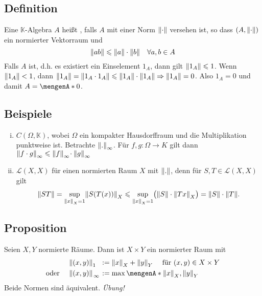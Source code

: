 \subsection[Definition: Normierte $\mathds{K}$-Algebra]{Definition} %
\label{sub:210}
Eine $\mathds{K}$-Algebra $A$ heißt , falls $A$ mit einer Norm $\norm{\cdot}$ versehen ist, so dass $(A,\norm{\cdot} )$ ein normierter Vektorraum und
\[
	\norm{a b} \le \norm{a} \cdot \norm{b} \quad \forall a,b \in A   
\]
Falls $A$  ist, d.h. es existiert ein Einselement $1_A$, dann gilt $\norm{1_A} \le 1$.
Wenn $\norm{1_A} < 1$, dann $\norm{1_A} = \norm{1_A \cdot 1_A} \le \norm{1_A} \cdot \norm{1_A} \Rightarrow \norm{1_A} =0 $. Also $1_A=0$ und damit $A= \set{0}$.

\subsection[Beispiele für normierte Algebren]{Beispiele} %
\label{sub:211}
\begin{enumerate}[(i)]
	\item $C(\Omega,\mathds{K})$, wobei $\Omega$ ein kompakter Hausdorffraum und die Multiplikation punktweise ist. Betrachte $\norm[\infty]{.}$. Für $f,g \colon \Omega \to K$ gilt dann
	$\norm[\infty]{f \cdot g} \le \norm[\infty]{f} \!\cdot \norm[\infty]{g}$
	\item $\mathcal{L}(X,X)$ für einen normierten Raum $X$ mit $\norm{.}$, denn für $S,T \in \mathcal{L}(X,X)$ gilt
	\[
		\norm{S T} = \sup_{\norm[X]{x}=1} \norm[X]{S(T(x))} \le \sup_{\norm[X]{x}=1} \enbrace[\big]{\norm{S} \cdot \norm[X]{Tx}} = \norm{S} \cdot \norm{T}.     
	\]
\end{enumerate}

\subsection[Proposition: Norm auf dem Produkt normierter Räume]{Proposition} %
\label{sub:212}
Seien $X,Y$ normierte Räume. Dann ist $X \times Y$ ein normierter Raum mit 
\begin{align*}
	 \norm[\minwidthbox{1\hfill}{1em}]{(x,y)} &:= \norm[X]{x} + \norm[Y]{y}   \quad \text{ für } (x,y) \in X \times Y \\
	\text{oder } \quad \norm[\minwidthbox{\infty}{1em}]{(x,y)} &:= \max \set{\norm[X]{x}, \norm[Y]{y}}  
\end{align*}
Beide Normen sind äquivalent.
\emph{Übung!} \bewende

